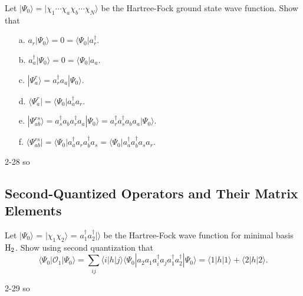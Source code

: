 \documentclass[a4paper]{book}
\begin{document}
	\begin{exercise}
	Let $|\Psi_0\rangle = | \chi_1 \cdots \chi_a \chi_b \cdots \chi_N \rangle$ be the Hartree-Fock ground state wave function. Show that
	\begin{enumerate}
	
	\item[a.] $a_r | \Psi_0 \rangle = 0 = \langle \Psi_0 | a^\dagger_r$.
	
	\item[b.] $a^\dagger_a | \Psi_0 \rangle = 0 = \langle \Psi_0 | a_a$.
	
	\item[c.] $| \Psi^r_a \rangle = a^\dagger_r a_a | \Psi_0 \rangle $.
	
	\item[d.] $\langle \Psi^r_a | = \langle \Psi_0 | a^\dagger_a a_r$.
	
	\item[e.] $| \Psi^{rs}_{ab} \rangle = a^\dagger_s a_b a^\dagger_r a_a | \Psi_0 \rangle = a^\dagger_r a^\dagger_s a_b  a_a | \Psi_0 \rangle $.
	
	\item[f.] $\langle \Psi^{rs}_{ab} | = \langle \Psi_0 | a^\dagger_a a_r a^\dagger_b a_s = \langle \Psi_0 | a^\dagger_a a^\dagger_b a_s a_r$.
	
	\end{enumerate}
	\end{exercise}
	
	\begin{solution}
		2-28 so
	\end{solution}
	
	\subsection{Second-Quantized Operators and Their Matrix Elements}
	
	\begin{exercise}
	Let $|\Psi_0 \rangle$ = $| \chi_1 \chi_2 \rangle$ = $a^\dagger_1 a^\dagger_2 | \rangle$ be the Hartree-Fock wave function for minimal basis $\ce{H2}$. Show using second quantization that
	\[
		\langle \Psi_0 | \mathscr{O}_1 | \Psi_0 \rangle = \sum_{ij} \langle i | h | j \rangle \langle \Psi_0 | a_2 a_1 a^\dagger_i a_j a^\dagger_1 a^\dagger_2 | \Psi_0 \rangle = \langle 1 | h | 1 \rangle + \langle 2 | h | 2 \rangle.
	\]
	\end{exercise}
	
	\begin{solution}
		2-29 so
	\end{solution}
	
\end{document}
